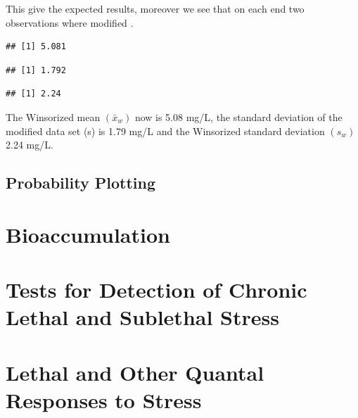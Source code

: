 \documentclass{tufte-book}\usepackage{knitr}
\begin{document}
This give the expected results, moreover we see that on each end two observations
where modified .

\begin{knitrout}
\color{fgcolor}\begin{kframe}
\begin{alltt}
\end{alltt}
\begin{verbatim}
## [1] 5.081
\end{verbatim}
\begin{alltt}
\end{alltt}
\begin{verbatim}
## [1] 1.792
\end{verbatim}
\begin{alltt}
\end{alltt}
\begin{verbatim}
## [1] 2.24
\end{verbatim}
\end{kframe}
\end{knitrout}





The Winsorized mean $(\bar{x}_w)$ now is 5.08 mg/L, the standard 
deviation of the modified data set (s) is 1.79 mg/L and the 
Winsorized standard deviation $(s_w)$ 2.24 mg/L.



\section{Probability Plotting}




\chapter{Bioaccumulation}



\chapter{Tests for Detection of Chronic Lethal and Sublethal Stress}



\chapter{Lethal and Other Quantal Responses to Stress}
\end{document}

